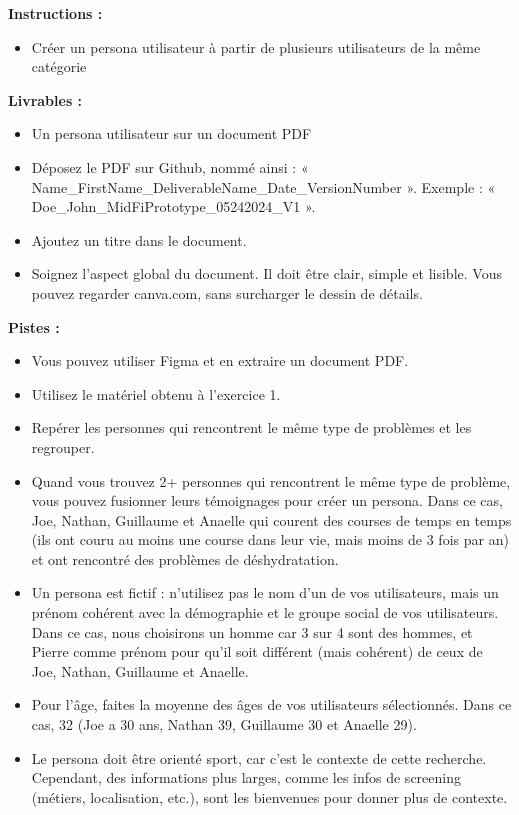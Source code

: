 \makeheaderfiles

\textbf{Instructions :}

\begin{itemize}
\item Créer un persona utilisateur à partir de plusieurs utilisateurs de la même catégorie
\end{itemize}

\textbf{Livrables :}

\begin{itemize}
\item Un persona utilisateur sur un document PDF
\item Déposez le PDF sur Github, nommé ainsi : « Name\_FirstName\_DeliverableName\_Date\_VersionNumber ». Exemple : « Doe\_John\_MidFiPrototype\_05242024\_V1 ».
\item Ajoutez un titre dans le document.
\item Soignez l'aspect global du document. Il doit être clair, simple et lisible. Vous pouvez regarder canva.com, sans surcharger le dessin de détails.
\end{itemize}

\textbf{Pistes :}

\begin{itemize}
\item Vous pouvez utiliser Figma et en extraire un document PDF.
\item Utilisez le matériel obtenu à l'exercice 1.
\item Repérer les personnes qui rencontrent le même type de problèmes et les regrouper.
\item Quand vous trouvez 2+ personnes qui rencontrent le même type de problème, vous pouvez fusionner leurs témoignages pour créer un persona. Dans ce cas, Joe, Nathan, Guillaume et Anaelle qui courent des courses de temps en temps (ils ont couru au moins une course dans leur vie, mais moins de 3 fois par an) et ont rencontré des problèmes de déshydratation.
\item Un persona est fictif : n'utilisez pas le nom d'un de vos utilisateurs, mais un prénom cohérent avec la démographie et le groupe social de vos utilisateurs. Dans ce cas, nous choisirons un homme car 3 sur 4 sont des hommes, et Pierre comme prénom pour qu'il soit différent (mais cohérent) de ceux de Joe, Nathan, Guillaume et Anaelle.
\item Pour l'âge, faites la moyenne des âges de vos utilisateurs sélectionnés. Dans ce cas, 32 (Joe a 30 ans, Nathan 39, Guillaume 30 et Anaelle 29).
\item Le persona doit être orienté sport, car c'est le contexte de cette recherche. Cependant, des informations plus larges, comme les infos de screening (métiers, localisation, etc.), sont les bienvenues pour donner plus de contexte.
\end{itemize}

